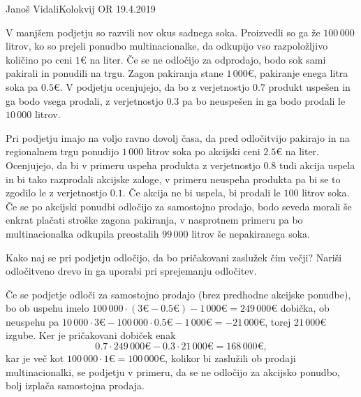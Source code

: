 \begin{naloga}{Janoš Vidali}{Kolokvij OR 19.4.2019}
\begin{vprasanje}
V manjšem podjetju so razvili nov okus sadnega soka.
Proizvedli so ga že $100\,000$ litrov,
ko so prejeli ponudbo multinacionalke,
da odkupijo vso razpoložljivo količino po ceni $1 €$ na liter.
Če se ne odločijo za odprodajo, bodo sok sami pakirali in ponudili na trgu.
Zagon pakiranja stane $1\,000 €$, pakiranje enega litra soka pa $0.5 €$.
V podjetju ocenjujejo,
da bo z verjetnostjo $0.7$ produkt uspešen in ga bodo vsega prodali,
z verjetnostjo $0.3$ pa bo neuspešen in ga bodo prodali le $10\,000$ litrov.

Pri podjetju imajo na voljo ravno dovolj časa,
da pred odločitvijo pakirajo in na regionalnem trgu
ponudijo $1\,000$ litrov soka po akcijski ceni $2.5 €$ na liter.
Ocenjujejo,
da bi v primeru uspeha produkta z verjetnostjo $0.8$ tudi akcija uspela
in bi tako razprodali akcijske zaloge,
v primeru neuspeha produkta pa bi se to zgodilo le z verjetnostjo $0.1$.
Če akcija ne bi uspela, bi prodali le $100$ litrov soka.
Če se po akcijski ponudbi odločijo za samostojno prodajo,
bodo seveda morali še enkrat plačati stroške zagona pakiranja,
v nasprotnem primeru pa bo multinacionalka
odkupila preostalih $99\,000$ litrov še nepakiranega soka.

\smallskip

Kako naj se pri podjetju odločijo, da bo pričakovani zaslužek čim večji?
Nariši od\-lo\-čit\-ve\-no drevo in ga uporabi pri sprejemanju odločitev.
\end{vprasanje}

\begin{odgovor}
Če se podjetje odloči za samostojno prodajo (brez predhodne akcijske ponudbe),
bo ob uspehu imelo
$100\,000 \cdot (3 € - 0.5 €) - 1\,000 € = 249\,000 €$ dobička,
ob ne\-uspe\-hu pa
$10\,000 \cdot 3 € - 100\,000 \cdot 0.5 € - 1\,000 € = -21\,000 €$,
torej $21\,000 €$ izgube.
Ker je pričakovani dobiček enak
$$
0.7 \cdot 249\,000 € - 0.3 \cdot 21\,000 € = 168\,000 €,
$$
kar je več kot $100\,000 \cdot 1 € = 100\,000 €$,
kolikor bi zaslužili ob prodaji multinacionalki,
se podjetju v primeru, da se ne odločijo za akcijsko ponudbo,
bolj izplača samostojna prodaja.


\end{odgovor}
\end{naloga}
